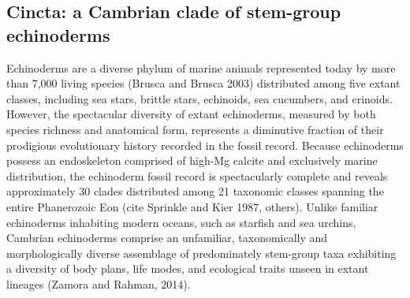 \documentclass{article}
\begin{document}
\subsection{Cincta: a Cambrian clade of stem-group echinoderms}
Echinoderms are a diverse phylum of marine animals represented today by more than 7,000 living species (Brusca and Brusca 2003) distributed among five extant classes, including sea stars, brittle stars, echinoids, sea cucumbers, and crinoids. However, the spectacular diversity of extant echinoderms, measured by both species richness and anatomical form, represents a diminutive fraction of their prodigious evolutionary history recorded in the fossil record. Because echinoderms possess an endoskeleton comprised of high-Mg calcite and exclusively marine distribution, the echinoderm fossil record is spectacularly complete and reveals approximately 30 clades distributed among 21 taxonomic classes spanning the entire Phanerozoic Eon (cite Sprinkle and Kier 1987, others). Unlike familiar echinoderms inhabiting modern oceans, such as starfish and sea urchins, Cambrian echinoderms comprise an unfamiliar, taxonomically and morphologically diverse assemblage of predominately stem-group taxa exhibiting a diversity of body plans, life modes, and ecological traits unseen in extant lineages (Zamora and Rahman, 2014). 
\end{document}
